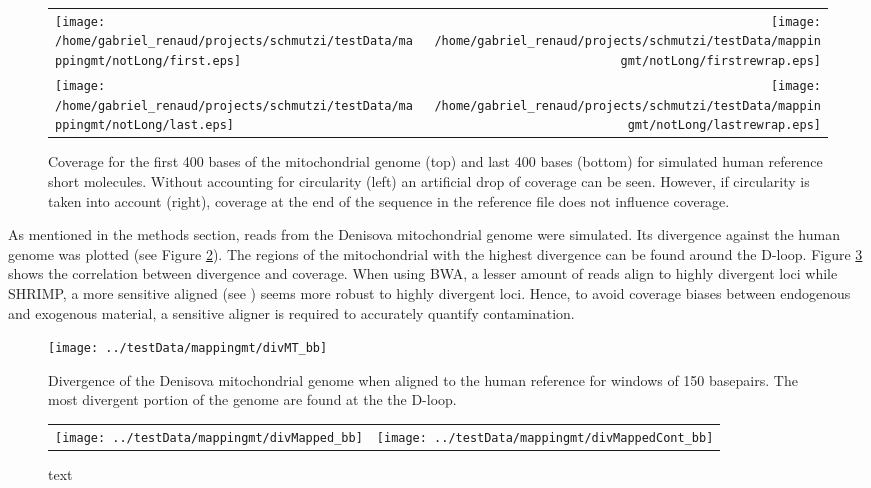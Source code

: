 \documentclass[a4paper,12pt]{article}
\begin{document}
\begin{itemize}
\begin{itemize}
\begin{figure}[H]
\centering
\begin{tabular}{lr}
\texttt{[image: /home/gabriel\_renaud/projects/schmutzi/testData/mappingmt/notLong/first.eps]} &
\texttt{[image: /home/gabriel\_renaud/projects/schmutzi/testData/mappingmt/notLong/firstrewrap.eps]} \\
\texttt{[image: /home/gabriel\_renaud/projects/schmutzi/testData/mappingmt/notLong/last.eps]} &
\texttt{[image: /home/gabriel\_renaud/projects/schmutzi/testData/mappingmt/notLong/lastrewrap.eps]} \\
\end{tabular}
\label{fig:wrappingaroundmt}
\caption{Coverage for the first 400 bases of the mitochondrial genome (top) and last 400 bases (bottom) for simulated human reference short molecules. Without accounting for circularity (left) an artificial drop of coverage can be seen. However, if circularity is taken into account (right), coverage at the end of the sequence in the reference file does not influence coverage. }
\end{figure}


As mentioned in the methods section, reads from the Denisova mitochondrial genome were simulated. Its divergence against the human genome was plotted (see Figure \ref{fig:divergenceMT}). The regions of the mitochondrial with the highest divergence can be found around the D-loop. Figure \ref{fig:coverageversusdiv} shows the correlation between divergence and coverage. When using BWA, a lesser amount of reads align to highly divergent loci while SHRIMP, a more sensitive aligned (see \cite{ruffalo2011comparative}) seems more robust to highly divergent loci. Hence, to avoid coverage biases between endogenous and exogenous material, a sensitive aligner is required to accurately quantify contamination.


\begin{figure}[H]
\centering
\texttt{[image: ../testData/mappingmt/divMT\_bb]}
\label{fig:divergenceMT}
\caption{Divergence of the Denisova mitochondrial genome when aligned to the human reference for windows of 150 basepairs. The most divergent portion of the genome are found at the the D-loop.}
\end{figure}


\begin{figure}[H]
\centering
\begin{tabular}{lr}
\texttt{[image: ../testData/mappingmt/divMapped\_bb]} &
\texttt{[image: ../testData/mappingmt/divMappedCont\_bb]} \\
\end{tabular}
\caption{text}
\label{fig:coverageversusdiv}
\end{figure}


\end{itemize}
\end{itemize}
\end{document}
